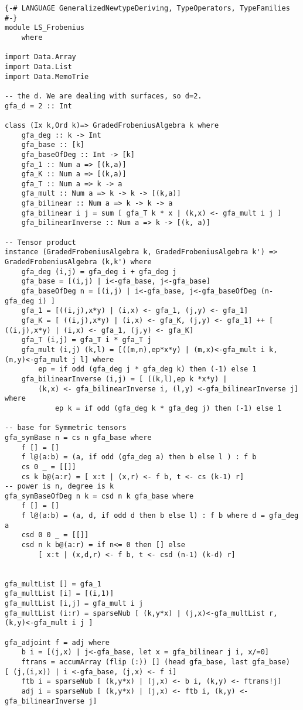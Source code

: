 \begin{lstlisting}
{-# LANGUAGE GeneralizedNewtypeDeriving, TypeOperators, TypeFamilies #-}
module LS_Frobenius 
	where

import Data.Array
import Data.List
import Data.MemoTrie

-- the d. We are dealing with surfaces, so d=2.
gfa_d = 2 :: Int

class (Ix k,Ord k)=> GradedFrobeniusAlgebra k where
	gfa_deg :: k -> Int
	gfa_base :: [k]
	gfa_baseOfDeg :: Int -> [k]
	gfa_1 :: Num a => [(k,a)]
	gfa_K :: Num a => [(k,a)]
	gfa_T :: Num a => k -> a
	gfa_mult :: Num a => k -> k -> [(k,a)]
	gfa_bilinear :: Num a => k -> k -> a
	gfa_bilinear i j = sum [ gfa_T k * x | (k,x) <- gfa_mult i j ]
	gfa_bilinearInverse :: Num a => k -> [(k, a)]

-- Tensor product
instance (GradedFrobeniusAlgebra k, GradedFrobeniusAlgebra k') => GradedFrobeniusAlgebra (k,k') where
	gfa_deg (i,j) = gfa_deg i + gfa_deg j
	gfa_base = [(i,j) | i<-gfa_base, j<-gfa_base]
	gfa_baseOfDeg n = [(i,j) | i<-gfa_base, j<-gfa_baseOfDeg (n-gfa_deg i) ]
	gfa_1 = [((i,j),x*y) | (i,x) <- gfa_1, (j,y) <- gfa_1]
	gfa_K = [ ((i,j),x*y) | (i,x) <- gfa_K, (j,y) <- gfa_1] ++ [ ((i,j),x*y) | (i,x) <- gfa_1, (j,y) <- gfa_K] 
	gfa_T (i,j) = gfa_T i * gfa_T j
	gfa_mult (i,j) (k,l) = [((m,n),ep*x*y) | (m,x)<-gfa_mult i k, (n,y)<-gfa_mult j l] where
		ep = if odd (gfa_deg j * gfa_deg k) then (-1) else 1
	gfa_bilinearInverse (i,j) = [ ((k,l),ep k *x*y) | 
		(k,x) <- gfa_bilinearInverse i, (l,y) <-gfa_bilinearInverse j] where
			ep k = if odd (gfa_deg k * gfa_deg j) then (-1) else 1

-- base for Symmetric tensors
gfa_symBase n = cs n gfa_base where
	f [] = []
	f l@(a:b) = (a, if odd (gfa_deg a) then b else l ) : f b
	cs 0 _ = [[]]
	cs k b@(a:r) = [ x:t | (x,r) <- f b, t <- cs (k-1) r] 
-- power is n, degree is k
gfa_symBaseOfDeg n k = csd n k gfa_base where
	f [] = []
	f l@(a:b) = (a, d, if odd d then b else l) : f b where d = gfa_deg a
	csd 0 0 _ = [[]]
	csd n k b@(a:r) = if n<= 0 then [] else
		[ x:t | (x,d,r) <- f b, t <- csd (n-1) (k-d) r] 
	
	
gfa_multList [] = gfa_1
gfa_multList [i] = [(i,1)]
gfa_multList [i,j] = gfa_mult i j
gfa_multList (i:r) = sparseNub [ (k,y*x) | (j,x)<-gfa_multList r, (k,y)<-gfa_mult i j ]

gfa_adjoint f = adj where
	b i = [(j,x) | j<-gfa_base, let x = gfa_bilinear j i, x/=0]
	ftrans = accumArray (flip (:)) [] (head gfa_base, last gfa_base)  [ (j,(i,x)) | i <-gfa_base, (j,x) <- f i] 
	ftb i = sparseNub [ (k,y*x) | (j,x) <- b i, (k,y) <- ftrans!j]
	adj i = sparseNub [ (k,y*x) | (j,x) <- ftb i, (k,y) <- gfa_bilinearInverse j]


\end{lstlisting}
